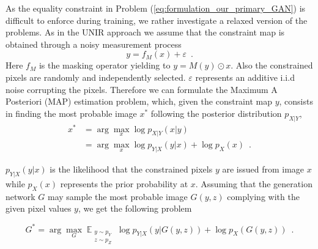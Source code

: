 As the equality constraint in  Problem (\ref{eq:formulation_our_primary_GAN}) is difficult to enforce during training, we rather investigate a relaxed version of the problems.
%
%
As in the UNIR approach \citep{Pajot2019} we assume that the constraint map is obtained through a noisy measurement process
\begin{equation}
y = f_M(x) + \varepsilon \enspace.
\label{eq:noisy_generation_primary_CGAN}
\end{equation}
Here $f_M$ is the masking operator yielding to $y = M(y) \odot x$. Also the constrained pixels are randomly and independently selected. $\varepsilon$ represents an additive i.i.d noise corrupting the pixels. Therefore
we can formulate the Maximum A Posteriori (MAP) estimation problem, which, given the constraint map $y$, consists in finding the most probable image $x^*$ following the posterior distribution $p_{X|Y}$,
\begin{align}
x^* &= \arg\max_x\log {p_{X|Y}}(x|y) \\
&= \arg\max_x\log p_{Y|X}(y|x) + \log p_X(x) \enspace.
\label{eq:bayesian_formulation_our_primary_CGAN}
\end{align}

\noindent $p_{Y|X}(y|x)$ is the likelihood that the constrained pixels $y$ are issued from image $x$ while $p_X(x)$ represents the prior probability at $x$. Assuming that the generation network $G$ may sample the most probable image $G(y, z)$ complying with the given pixel values $y$, we get the following problem

\begin{equation}
G^* = \arg\max_G \mathop{\mathbb{E}}_{\substack{y\sim p_Y\\z\sim p_Z}} \log {p_{Y|X}}(y|G(y, z)
) + \log p_X(G(y, z)) \enspace.
\label{eq:bayesian_formulation_our_primary_CGAN_G}
\end{equation}

